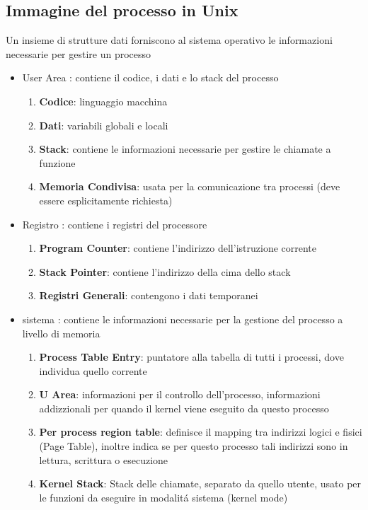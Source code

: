 \subsection{Immagine del processo in Unix}
Un insieme di strutture dati forniscono al sistema operativo le informazioni necessarie per gestire un processo
\begin{itemize}
    \item User Area : contiene il codice, i dati e lo stack del processo
    \begin{enumerate}
        \item \textbf{Codice}: linguaggio macchina
        \item \textbf{Dati}: variabili globali e locali
        \item \textbf{Stack}: contiene le informazioni necessarie per gestire le chiamate a funzione
        \item \textbf{Memoria Condivisa}: usata per la comunicazione tra processi (deve essere esplicitamente richiesta)
    \end{enumerate}
    \item Registro : contiene i registri del processore
    \begin{enumerate}
        \item \textbf{Program Counter}: contiene l'indirizzo dell'istruzione corrente
        \item \textbf{Stack Pointer}: contiene l'indirizzo della cima dello stack
        \item \textbf{Registri Generali}: contengono i dati temporanei
    \end{enumerate}
    \item sistema : contiene le informazioni necessarie per la gestione del processo a livello di memoria
    \begin{enumerate}
        \item \textbf{Process Table Entry}: puntatore alla tabella di tutti i processi, dove individua quello corrente
        \item \textbf{U Area}: informazioni per il controllo dell'processo, informazioni addizzionali per quando il kernel viene eseguito da questo processo
        \item \textbf{Per process region table}: definisce il mapping tra indirizzi logici e fisici (Page Table), inoltre indica se per questo processo tali indirizzi sono in lettura, scrittura o esecuzione
        \item \textbf{Kernel Stack}: Stack delle chiamate, separato da quello utente, usato per le funzioni da eseguire in modalitá sistema (kernel mode)
    \end{enumerate}
\end{itemize}
